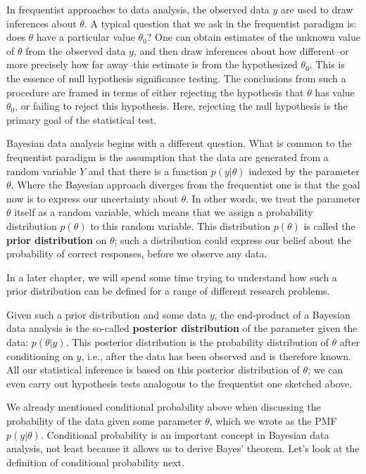 \documentclass[12pt,]{krantz}
\theoremstyle{definition}
\theoremstyle{definition}
\theoremstyle{definition}
\theoremstyle{remark}
\begin{document}
In frequentist approaches to data analysis, the observed data \(y\) are used to draw inferences about \(\theta\). A typical question that we ask in the frequentist paradigm is: does \(\theta\) have a particular value \(\theta_0\)? One can obtain estimates of the unknown value of \(\theta\) from the observed data \(y\), and then draw inferences about how different--or more precisely how far away--this estimate is from the hypothesized \(\theta_0\). This is the essence of null hypothesis significance testing. The conclusions from such a procedure are framed in terms of either rejecting the hypothesis that \(\theta\) has value \(\theta_0\), or failing to reject this hypothesis. Here, rejecting the null hypothesis is the primary goal of the statistical test.

Bayesian data analysis begins with a different question. What is common to the frequentist paradigm is the assumption that the data are generated from a random variable \(Y\) and that there is a function \(p(y|\theta)\) indexed by the parameter \(\theta\). Where the Bayesian approach diverges from the frequentist one is that the goal now is to express our uncertainty about \(\theta\). In other words, we treat the parameter \(\theta\) itself as a random variable, which means that we assign a probability distribution \(p(\theta)\) to this random variable. This distribution \(p(\theta)\) is called the \textbf{prior distribution} on \(\theta\); such a distribution could express our belief about the probability of correct responses, before we observe any data.

In a later chapter, we will spend some time trying to understand how such a prior distribution can be defined for a range of different research problems.

Given such a prior distribution and some data \(y\), the end-product of a Bayesian data analysis is the so-called \textbf{posterior distribution} of the parameter given the data: \(p(\theta | y)\). This posterior distribution is the probability distribution of \(\theta\) after conditioning on \(y\), i.e., after the data has been observed and is therefore known. All our statistical inference is based on this posterior distribution of \(\theta\); we can even carry out hypothesis tests analogous to the frequentist one sketched above.

We already mentioned conditional probability above when discussing the probability of the data given some parameter \(\theta\), which we wrote as the PMF \(p(y|\theta)\). Conditional probability is an important concept in Bayesian data analysis, not least because it allows us to derive Bayes' theorem. Let's look at the definition of conditional probability next.
\end{document}
